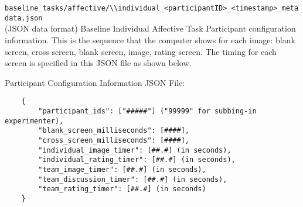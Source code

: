 \begin{description}
\medskip
\item\verb|baseline_tasks/affective/\\individual_<participantID>_<timestamp>_metadata.json|\\
    (JSON data format)
    Baseline Individual Affective Task Participant configuration information. This
    is the sequence that the computer shows for each image: blank screen, cross
    screen, blank screen, image, rating screen. The timing for each screen is
    specified in this JSON file as shown below.

Participant Configuration Information JSON File:
\begin{verbatim}
    {
        "participant_ids": ["#####"] ("99999" for subbing-in experimenter),
        "blank_screen_milliseconds": [####],
        "cross_screen_milliseconds": [####],
        "individual_image_timer": [##.#] (in seconds),
        "individual_rating_timer": [##.#] (in seconds),
        "team_image_timer": [##.#] (in seconds),
        "team_discussion_timer": [##.#] (in seconds),
        "team_rating_timer": [##.#] (in seconds)
    }
\end{verbatim}



\end{description}
